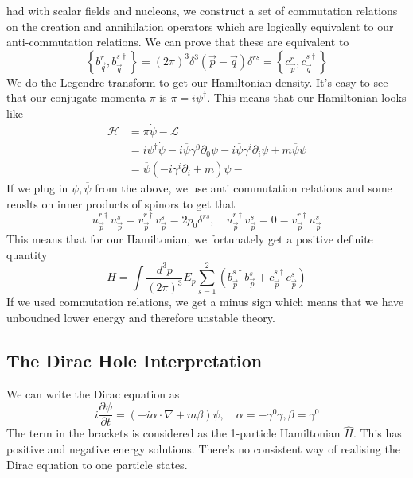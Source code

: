 had with scalar fields and nucleons, 
we construct a set of commutation relations on 
the creation and annihilation operators
which are logically equivalent to our anti-commutation 
relations. We can prove that these are equivalent to 
\[
\left\{  b_{ \vec{q} } ^ r , b _{ \vec{q} } ^{ s \dagger }  \right\}  = 
( 2 \pi ) ^ 3 \delta ^ 3 ( \vec{p} - \vec{q} ) \delta ^{ rs }  = \left\{  c_{ \vec{p} } ^ r , 
c _{ \vec{q} } ^{ s \dagger }\right\} 
\] We do the Legendre transform to 
get our Hamiltonian density. It's easy to 
see that our conjugate momenta $ \pi $ is 
$ \pi = i \psi^{ \dagger } $. This means that 
our Hamiltonian looks like 
\begin{align*}
\mathcal{ H } &=  \pi \dot{ \psi }  - \mathcal{ L }   \\
&=  i \psi ^ \dagger \dot{ \psi }  - i \overline{ \psi } \gamma ^ 0 \partial  _ 0 
\psi - i \overline{ \psi } \gamma ^ i \partial  _ i \psi + m \overline{ \psi } \psi \\
&=  \overline{ \psi }( - i \gamma ^ i \partial  _ i + m ) \psi -  
\end{align*}
If we plug in $ \psi , \overline{ \psi } $ from the above, 
we use anti commutation relations and some reuslts on inner 
products of spinors to get that 
\[
u _{ \vec{p} } ^{ r \dagger } u _{ \vec{p} } ^ s  = 
v_{\vec{p} } ^{ r \dagger } v _{ \vec{p} } ^ s  = 2 p_0 \delta ^{ rs } , \quad 
u_{\vec{p} } ^{  r\dagger } v_{\vec{p} } ^ s = 0 = v_{ \vec{p} } ^{ r \dagger  } u_{ \vec{p} } ^ s 
\] 
This means that for our Hamiltonian, 
we fortunately get a positive definite quantity
\[
H = \int \frac{ d^ 3 p }{ ( 2 \pi ) ^ 3 } E _ p \sum_{ s = 1 } ^ 2 
\left(  b_{ \vec{p} } ^{ s \dagger  } b _{ \vec{p} } ^ s 
+ c _{ \vec{p} } ^{ s \dagger } c _{ \vec{p} } ^ s \right) 
\] If we used commutation relations, we get a minus sign which means that we 
have unboudned lower energy and therefore unstable theory.

\subsection{The Dirac Hole Interpretation}
We can write the Dirac equation as 
\[
i \frac{\partial  \psi }{\partial  t }   = 
( - i \alpha \cdot  \nabla + m \beta ) \psi , \quad \alpha =  - \gamma ^ 0 \gamma , \beta = \gamma ^ 0 
\] The term in the brackets is considered as 
the 1-particle Hamiltonian $ \hat{ H } $. 
This has positive and negative energy solutions. 
There's no consistent way of realising the 
Dirac equation to one particle states.

